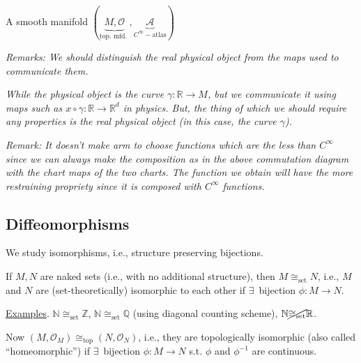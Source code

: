 \begin{definition}
  A smooth manifold $(\underbrace{ M,\mathcal{O} }_{\text{top. mfd. } }, \underbrace{ \mathcal{A}}_{C^{\infty}-\text{atlas}} )$ 
\end{definition}

\textit{Remarks: We should distinguish the real physical object from the maps used to communicate them.}


\textit{While the physical object is the curve $\gamma : \mathbb{R} \to M$, but we communicate it using maps such as $x \circ \gamma : \mathbb{R} \to \mathbb{R}^d$ in physics. But, the thing of which we should require any properties is the real physical object (in this case, the curve $\gamma$).}

\textit{Remark: It doesn't make arm to choose functions which are the less than $C^{\infty}$ since we can always make the composition as in the above commutation diagram with the chart maps of the two charts. The function we obtain will have the more restraining propriety since it is composed with $C^{\infty}$ functions.}

\subsection{Diffeomorphisms}

We study isomorphisms, i.e., structure preserving bijections.

If $M,N$ are naked sets (i.e., with no additional structure), then $M \cong_{\text{set}} N$, i.e., $M$ and $N$ are (set-theoretically) isomorphic to each other if $\exists \, $ bijection $\phi : M \to N$.

\underline{Examples}.  $\mathbb{N} \cong_{\text{set}} \mathbb{Z}$, $\mathbb{N} \cong_{\text{set}} \mathbb{Q}$  (using diagonal counting scheme), $\mathbb{N} \cancel{\cong_{\text{set}}} \mathbb{R}$.

Now $(M, \mathcal{O}_M) \cong_{\text{top}} (N,\mathcal{O}_N)$, i.e., they are topologically isomorphic (also called ``homeomorphic'') if $\exists \, $ bijection $\phi : M \to N$  s.t. $\phi$ and $\phi^{-1}$ are continuous.  

